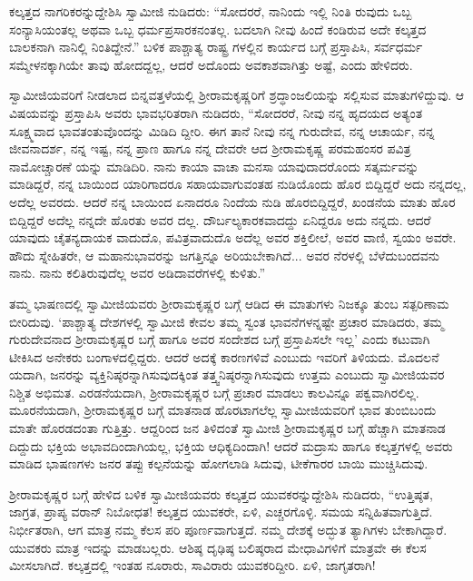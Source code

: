 ಕಲ್ಕತ್ತದ ನಾಗರಿಕರನ್ನುದ್ದೇಶಿಸಿ ಸ್ವಾಮೀಜಿ ನುಡಿದರು: “ಸೋದರರೆ, ನಾನಿಂದು ಇಲ್ಲಿ ನಿಂತಿ ರುವುದು ಒಬ್ಬ ಸಂನ್ಯಾಸಿಯಂತಲ್ಲ ಅಥವಾ ಒಬ್ಬ ಧರ್ಮಪ್ರಸಾರಕನಂತಲ್ಲ. ಬದಲಾಗಿ ನೀವು ಹಿಂದೆ ಕಂಡಿರುವ ಅದೇ ಕಲ್ಕತ್ತದ ಬಾಲಕನಾಗಿ ನಾನಿಲ್ಲಿ ನಿಂತಿದ್ದೇನೆ.” ಬಳಿಕ ಪಾಶ್ಚಾತ್ಯ ರಾಷ್ಟ್ರ ಗಳಲ್ಲಿನ ಕಾರ್ಯದ ಬಗ್ಗೆ ಪ್ರಸ್ತಾಪಿಸಿ, ಸರ್ವಧರ್ಮ ಸಮ್ಮೇಳನಕ್ಕಾಗಿಯೇ ತಾವು ಹೋದದ್ದಲ್ಲ, ಆದರೆ ಅದೊಂದು ಅವಕಾಶವಾಗಿತ್ತು ಅಷ್ಟೆ, ಎಂದು ಹೇಳಿದರು.

ಸ್ವಾಮೀಜಿಯವರಿಗೆ ನೀಡಲಾದ ಬಿನ್ನವತ್ತಳೆಯಲ್ಲಿ ಶ್ರೀರಾಮಕೃಷ್ಣರಿಗೆ ಶ್ರದ್ಧಾಂಜಲಿಯನ್ನು ಸಲ್ಲಿಸುವ ಮಾತುಗಳಿದ್ದುವು. ಆ ವಿಷಯವನ್ನು ಪ್ರಸ್ತಾಪಿಸಿ ಅವರು ಭಾವಭರಿತರಾಗಿ ನುಡಿದರು, “ಸೋದರರೆ, ನೀವು ನನ್ನ ಹೃದಯದ ಅತ್ಯಂತ ಸೂಕ್ಷ್ಮವಾದ ಭಾವತಂತುವೊಂದನ್ನು ಮಿಡಿದಿ ದ್ದೀರಿ. ಈಗ ತಾನೆ ನೀವು ನನ್ನ ಗುರುದೇವ, ನನ್ನ ಆಚಾರ್ಯ, ನನ್ನ ಜೀವನಾದರ್ಶ, ನನ್ನ ಇಷ್ಟ, ನನ್ನ ಪ್ರಾಣ ಹಾಗೂ ನನ್ನ ದೇವರೇ ಆದ ಶ್ರೀರಾಮಕೃಷ್ಣ ಪರಮಹಂಸರ ಪವಿತ್ರ ನಾಮೋಚ್ಚಾರಣೆ ಯನ್ನು ಮಾಡಿದಿರಿ. ನಾನು ಕಾಯಾ ವಾಚಾ ಮನಸಾ ಯಾವುದಾದರೊಂದು ಸತ್ಕರ್ಮವನ್ನು ಮಾಡಿದ್ದರೆ, ನನ್ನ ಬಾಯಿಂದ ಯಾರಿಗಾದರೂ ಸಹಾಯವಾಗುವಂತಹ ನುಡಿಯೊಂದು ಹೊರ ಬಿದ್ದಿದ್ದರೆ ಅದು ನನ್ನದಲ್ಲ, ಅದೆಲ್ಲ ಅವರದು. ಆದರೆ ನನ್ನ ಬಾಯಿಂದ ಏನಾದರೂ ನಿಂದೆಯ ನುಡಿ ಹೊರಬಿದ್ದಿದ್ದರೆ, ಖಂಡನೆಯ ಮಾತು ಹೊರ ಬಿದ್ದಿದ್ದರೆ ಅದೆಲ್ಲ ನನ್ನದೇ ಹೊರತು ಅವರ ದಲ್ಲ. ದೌರ್ಬಲ್ಯಕಾರಕವಾದದ್ದು ಏನಿದ್ದರೂ ಅದು ನನ್ನದು. ಆದರೆ ಯಾವುದು ಚೈತನ್ಯದಾಯಕ ವಾದುದೊ, ಪವಿತ್ರವಾದುದೊ ಅದೆಲ್ಲ ಅವರ ಶಕ್ತಿಲೀಲೆ, ಅವರ ವಾಣಿ, ಸ್ವಯಂ ಅವರೇ. ಹೌದು ಸ್ನೇಹಿತರೇ, ಆ ಮಹಾನುಭಾವರನ್ನು ಜಗತ್ತಿನ್ನೂ ಅರಿಯಬೇಕಾಗಿದೆ... ಅವರ ನೆರಳಲ್ಲಿ ಬೆಳೆದುಬಂದವನು ನಾನು. ನಾನು ಕಲಿತಿರುವುದೆಲ್ಲ ಅವರ ಅಡಿದಾವರೆಗಳಲ್ಲಿ ಕುಳಿತು.”

ತಮ್ಮ ಭಾಷಣದಲ್ಲಿ ಸ್ವಾಮೀಜಿಯವರು ಶ್ರೀರಾಮಕೃಷ್ಣರ ಬಗ್ಗೆ ಆಡಿದ ಈ ಮಾತುಗಳು ನಿಜಕ್ಕೂ ತುಂಬ ಸತ್ಪರಿಣಾಮ ಬೀರಿದುವು. ‘ಪಾಶ್ಚಾತ್ಯ ದೇಶಗಳಲ್ಲಿ ಸ್ವಾಮೀಜಿ ಕೇವಲ ತಮ್ಮ ಸ್ವಂತ ಭಾವನೆಗಳನ್ನಷ್ಟೇ ಪ್ರಚಾರ ಮಾಡಿದರು, ತಮ್ಮ ಗುರುದೇವನಾದ ಶ್ರೀರಾಮಕೃಷ್ಣರ ಬಗ್ಗೆ ಹಾಗೂ ಅವರ ಸಂದೇಶದ ಬಗ್ಗೆ ಪ್ರಸ್ತಾಪಿಸಲೇ ಇಲ್ಲ’ ಎಂದು ಕಟುವಾಗಿ ಟೀಕಿಸಿದ ಅನೇಕರು ಬಂಗಾಳದಲ್ಲಿದ್ದರು. ಆದರೆ ಅದಕ್ಕೆ ಕಾರಣಗಳಿವೆ ಎಂಬುದು ಇವರಿಗೆ ತಿಳಿಯದು. ಮೊದಲನೆ ಯದಾಗಿ, ಜನರನ್ನು ವ್ಯಕ್ತಿನಿಷ್ಠರನ್ನಾಗಿಸುವುದಕ್ಕಿಂತ ತತ್ತ್ವನಿಷ್ಠರನ್ನಾಗಿಸುವುದು ಉತ್ತಮ ಎಂಬುದು ಸ್ವಾಮೀಜಿಯವರ ನಿಶ್ಚಿತ ಅಭಿಮತ. ಎರಡನೆಯದಾಗಿ, ಶ್ರೀರಾಮಕೃಷ್ಣರ ಬಗ್ಗೆ ಪ್ರಚಾರ ಮಾಡಲು ಕಾಲವಿನ್ನೂ ಪಕ್ವವಾಗಿರಲಿಲ್ಲ. ಮೂರನೆಯದಾಗಿ, ಶ್ರೀರಾಮಕೃಷ್ಣರ ಬಗ್ಗೆ ಮಾತನಾಡ ಹೊರಟಾಗಲೆಲ್ಲ ಸ್ವಾಮೀಜಿಯವರಿಗೆ ಭಾವ ತುಂಬಿಬಂದು ಮಾತೇ ಹೊರಡದಂತಾ ಗುತ್ತಿತ್ತು. ಆದ್ದರಿಂದ ಜನ ತಿಳಿದಂತೆ ಸ್ವಾಮೀಜಿ ಶ್ರೀರಾಮಕೃಷ್ಣರ ಬಗ್ಗೆ ಹೆಚ್ಚಾಗಿ ಮಾತನಾಡ ದಿದ್ದುದು ಭಕ್ತಿಯ ಅಭಾವದಿಂದಾಗಿಯಲ್ಲ, ಭಕ್ತಿಯ ಆಧಿಕ್ಯದಿಂದಾಗಿ! ಆದರೆ ಮದ್ರಾಸು ಹಾಗೂ ಕಲ್ಕತ್ತಗಳಲ್ಲಿ ಅವರು ಮಾಡಿದ ಭಾಷಣಗಳು ಜನರ ತಪ್ಪು ಕಲ್ಪನೆಯನ್ನು ಹೋಗಲಾಡಿ ಸಿದುವು, ಟೀಕೆಗಾರರ ಬಾಯಿ ಮುಚ್ಚಿಸಿದುವು.

ಶ್ರೀರಾಮಕೃಷ್ಣರ ಬಗ್ಗೆ ಹೇಳಿದ ಬಳಿಕ ಸ್ವಾಮೀಜಿಯವರು ಕಲ್ಕತ್ತದ ಯುವಕರನ್ನುದ್ದೇಶಿಸಿ ನುಡಿದರು, “ಉತ್ತಿಷ್ಠತ, ಜಾಗ್ರತ, ಪ್ರಾಪ್ಯ ವರಾನ್ ನಿಬೋಧತ! ಕಲ್ಕತ್ತದ ಯುವಕರೇ, ಏಳಿ, ಎಚ್ಚರಗೊಳ್ಳಿ. ಸಮಯ ಸನ್ನಿಹಿತವಾಗುತ್ತಿದೆ. ನಿರ್ಭೀತರಾಗಿ, ಆಗ ಮಾತ್ರ ನಮ್ಮ ಕೆಲಸ ಪರಿ ಪೂರ್ಣವಾಗುತ್ತದೆ. ನಮ್ಮ ದೇಶಕ್ಕೆ ಅದ್ಭುತ ತ್ಯಾಗಿಗಳು ಬೇಕಾಗಿದ್ದಾರೆ. ಯುವಕರು ಮಾತ್ರ ಇದನ್ನು ಮಾಡಬಲ್ಲರು. ಆಶಿಷ್ಠ ದೃಢಿಷ್ಠ ಬಲಿಷ್ಠರಾದ ಮೇಧಾವಿಗಳಿಗೆ ಮಾತ್ರವೇ ಈ ಕೆಲಸ ಮೀಸಲಾಗಿದೆ. ಕಲ್ಕತ್ತದಲ್ಲಿ ಇಂತಹ ನೂರಾರು, ಸಾವಿರಾರು ಯುವಕರಿದ್ದೀರಿ. ಏಳಿ, ಜಾಗೃತರಾಗಿ!

